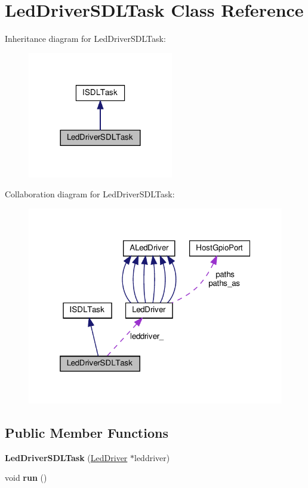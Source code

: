 \hypertarget{classLedDriverSDLTask}{}\section{Led\+Driver\+S\+D\+L\+Task Class Reference}
\label{classLedDriverSDLTask}


Inheritance diagram for Led\+Driver\+S\+D\+L\+Task\+:
\nopagebreak
\begin{figure}[H]
\begin{center}
\leavevmode
\includegraphics[width=180pt]{classLedDriverSDLTask__inherit__graph}
\end{center}
\end{figure}


Collaboration diagram for Led\+Driver\+S\+D\+L\+Task\+:
\nopagebreak
\begin{figure}[H]
\begin{center}
\leavevmode
\includegraphics[width=319pt]{classLedDriverSDLTask__coll__graph}
\end{center}
\end{figure}
\subsection*{Public Member Functions}
\begin{DoxyCompactItemize}
\item 
\mbox{\label{classLedDriverSDLTask_accfa3f780cbc2d0d8757b9a620f29af1}} 
{\bfseries Led\+Driver\+S\+D\+L\+Task} (\hyperlink{classLedDriver}{Led\+Driver} $\ast$leddriver)
\item 
\mbox{\label{classLedDriverSDLTask_aa9d58d144539c6e717e3c4f4e09dcfcc}} 
void {\bfseries run} ()
\end{DoxyCompactItemize}
